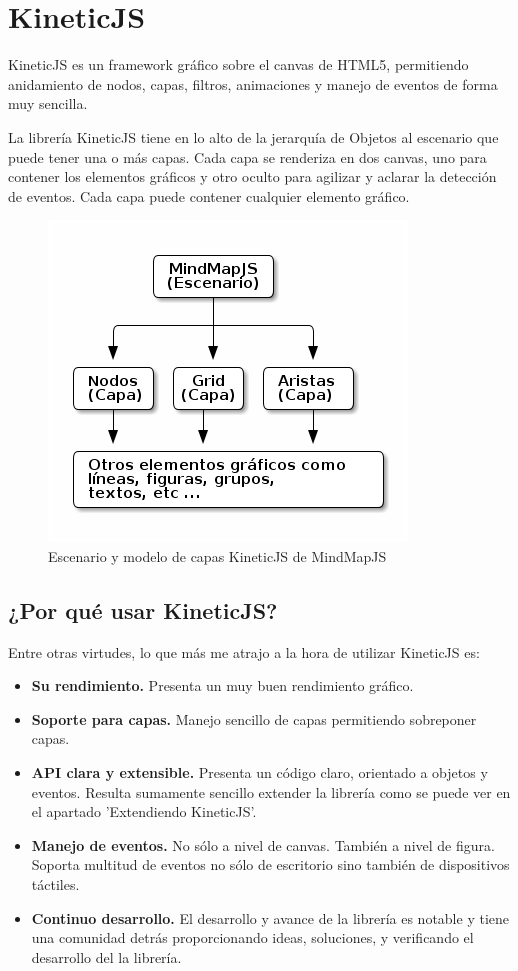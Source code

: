 \section{KineticJS}
KineticJS es un framework gráfico sobre el canvas de HTML5, permitiendo anidamiento de nodos, capas, filtros, animaciones y manejo de eventos de forma muy sencilla. 

La librería KineticJS tiene en lo alto de la jerarquía de Objetos al escenario que puede tener una o más capas. Cada capa se renderiza en dos canvas, uno para contener los elementos gráficos y otro oculto para agilizar y aclarar la detección de eventos. Cada capa puede contener cualquier elemento gráfico.

\begin{figure}[tbph]
\centering
\includegraphics[width=0.6\linewidth]{imagenes/diagrama-kineticjs.png}
\caption{Escenario y modelo de capas KineticJS de MindMapJS}
\label{fig:escenario-capas}
\end{figure}


\subsection{¿Por qué usar KineticJS?}
Entre otras virtudes, lo que más me atrajo a la hora de utilizar KineticJS es:
\begin{itemize}
\item \textbf{Su rendimiento.} Presenta un muy buen rendimiento gráfico. 
\item \textbf{Soporte para capas.} Manejo sencillo de capas permitiendo sobreponer capas.
\item \textbf{API clara y extensible.} Presenta un código claro, orientado a objetos y eventos. Resulta sumamente sencillo extender la librería como se puede ver en el apartado 'Extendiendo KineticJS'.
\item \textbf{Manejo de eventos.} No sólo a nivel de canvas. También a nivel de figura. Soporta multitud de eventos no sólo de escritorio sino también de dispositivos táctiles.
\item \textbf{Continuo desarrollo.} El desarrollo y avance de la librería es notable y tiene una comunidad detrás proporcionando ideas, soluciones, y verificando el desarrollo del la librería.
\end{itemize}

